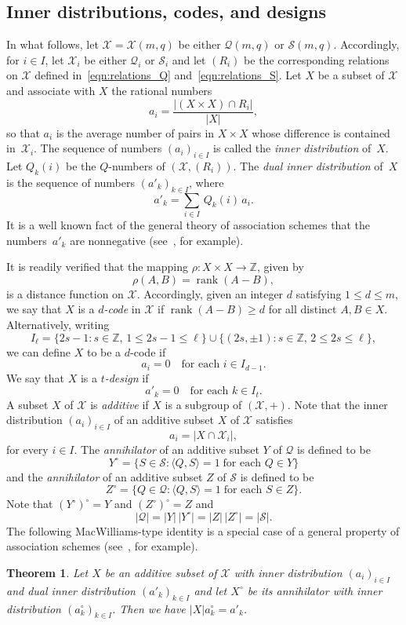 \documentclass[10pt]{article}
\newtheorem{theorem}{Theorem}[section]
\theoremstyle{definition}
\newcommand{\ZZ}{\mathbb{Z}}
\newcommand{\Q}{\mathscr{Q}}
\renewcommand{\S}{\mathscr{S}}
\newcommand{\X}{\mathscr{X}}
\newcommand{\abs}[1]{\lvert#1\rvert}
\DeclareMathOperator{\rank}{rank}
\begin{document}
\subsection{Inner distributions, codes, and designs}

In what follows, let $\X=\X(m,q)$ be either $\Q(m,q)$ or $\S(m,q)$. Accordingly, for $i\in I$, let $\X_i$ be either $\Q_i$ or $\S_i$  and let $(R_i)$ be the corresponding relations on $\X$ defined in~\eqref{eqn:relations_Q} and~\eqref{eqn:relations_S}. Let $X$ be a subset of $\X$ and associate with $X$ the rational numbers 
\[
a_i=\frac{\abs{(X\times X)\cap R_i}}{\abs{X}},
\]
so that $a_i$ is the average number of pairs in $X\times X$ whose difference is contained in~$\X_i$. The sequence of numbers $(a_i)_{i\in I}$ is called the \emph{inner distribution} of~$X$. Let $Q_k(i)$ be the $Q$-numbers of $(\X,(R_i))$. The \emph{dual inner distribution} of~$X$ is the sequence of numbers $(a'_k)_{k\in I}$, where
\begin{equation}
a'_k=\sum_{i\in I}\,Q_k(i)\,a_i.   \label{eqn:def_dual_distribution}
\end{equation}
It is a well known fact of the general theory of association schemes that the numbers~$a'_k$ are nonnegative (see~\cite[Theorem~3]{DelLev1998}, for example).
\par
It is readily verified that the mapping $\rho:X\times X\to\ZZ$, given by
\[
\rho(A,B)=\rank(A-B),
\]
is a distance function on $\X$. Accordingly, given an integer $d$ satisfying $1\le d\le m$, we say that $X$ is a \emph{$d$-code} in $\X$ if $\rank(A-B)\ge d$ for all distinct $A,B\in X$. Alternatively, writing
\[
I_\ell=\{2s-1:s\in\ZZ,\,1\le 2s-1\le \ell\}\cup\{(2s,\pm1):s\in\ZZ,\,2\le 2s\le \ell\},
\]
we can define $X$ to be a $d$-code if
\[
a_i=0\quad\text{for each $i\in I_{d-1}$}.
\]
We say that $X$ is a \emph{$t$-design} if
\[
a'_k=0\quad\text{for each $k\in I_t$}.
\]
A subset $X$ of $\X$ is \emph{additive} if $X$ is a subgroup of $(\X,+)$. Note that the inner distribution $(a_i)_{i\in I}$ of an additive subset $X$ of $\X$ satisfies
\[
a_i=\abs{X\cap \X_i},
\]
for every $i\in I$. The \emph{annihilator} of an additive subset $Y$ of $\Q$ is defined to be
\[
Y^\circ=\{S\in \S:\langle Q,S\rangle=1\;\text{for each $Q\in Y$}\}
\]
and the \emph{annihilator} of an additive subset $Z$ of $\S$ is defined to be
\[
Z^\circ=\{Q\in \Q:\langle Q,S\rangle=1\;\text{for each $S\in Z$}\}.
\]
Note that $(Y^\circ)^\circ=Y$ and $(Z^\circ)^\circ=Z$ and 
\[
\abs{\Q}=\abs{Y}\,\abs{Y^\circ}=\abs{Z}\,\abs{Z^\circ}=\abs{\S}.
\]
The following MacWilliams-type identity is a special case of a general property of association schemes (see~\cite[Theorem~27]{DelLev1998}, for example).
\begin{theorem}
\label{thm:dual}
Let $X$ be an additive subset of $\X$ with inner distribution $(a_i)_{i\in I}$ and dual inner distribution $(a'_k)_{k\in I}$ and let $X^\circ$ be its annihilator with inner distribution $(a^\circ_k)_{k\in I}$. Then we have $\abs{X}a^\circ_k=a'_k$.
\end{theorem}
\end{document}
